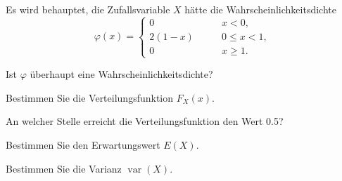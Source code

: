 Es wird behauptet, die Zufallsvariable $X$ hätte die
Wahrscheinlichkeitsdichte
\[
\varphi(x)=\begin{cases}
     0&\qquad x < 0,\\
2(1-x)&\qquad 0\le x < 1,\\
     0&\qquad x \ge 1.
\end{cases}
\]
\begin{teilaufgaben}
\item Ist $\varphi$ überhaupt eine Wahrscheinlichkeitsdichte?
\item Bestimmen Sie die Verteilungsfunktion $F_X(x)$.
\item An welcher Stelle erreicht die Verteilungsfunktion den Wert 0.5?
\item Bestimmen Sie den Erwartungswert $E(X)$.
\item Bestimmen Sie die Varianz $\operatorname{var}(X)$.
\end{teilaufgaben}

